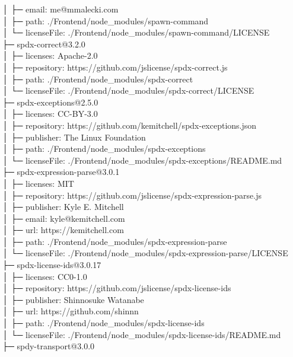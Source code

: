 │  ├─ email: me@mmalecki.com\\
│  ├─ path: ./Frontend/node\_modules/spawn-command\\
│  └─ licenseFile: ./Frontend/node\_modules/spawn-command/LICENSE\\
├─ spdx-correct@3.2.0\\
│  ├─ licenses: Apache-2.0\\
│  ├─ repository: https://github.com/jslicense/spdx-correct.js\\
│  ├─ path: ./Frontend/node\_modules/spdx-correct\\
│  └─ licenseFile: ./Frontend/node\_modules/spdx-correct/LICENSE\\
├─ spdx-exceptions@2.5.0\\
│  ├─ licenses: CC-BY-3.0\\
│  ├─ repository: https://github.com/kemitchell/spdx-exceptions.json\\
│  ├─ publisher: The Linux Foundation\\
│  ├─ path: ./Frontend/node\_modules/spdx-exceptions\\
│  └─ licenseFile: ./Frontend/node\_modules/spdx-exceptions/README.md\\
├─ spdx-expression-parse@3.0.1\\
│  ├─ licenses: MIT\\
│  ├─ repository: https://github.com/jslicense/spdx-expression-parse.js\\
│  ├─ publisher: Kyle E. Mitchell\\
│  ├─ email: kyle@kemitchell.com\\
│  ├─ url: https://kemitchell.com\\
│  ├─ path: ./Frontend/node\_modules/spdx-expression-parse\\
│  └─ licenseFile: ./Frontend/node\_modules/spdx-expression-parse/LICENSE\\
├─ spdx-license-ids@3.0.17\\
│  ├─ licenses: CC0-1.0\\
│  ├─ repository: https://github.com/jslicense/spdx-license-ids\\
│  ├─ publisher: Shinnosuke Watanabe\\
│  ├─ url: https://github.com/shinnn\\
│  ├─ path: ./Frontend/node\_modules/spdx-license-ids\\
│  └─ licenseFile: ./Frontend/node\_modules/spdx-license-ids/README.md\\
├─ spdy-transport@3.0.0\\
